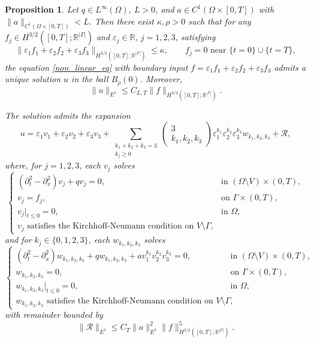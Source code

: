 \documentclass[11pt]{amsart}
\theoremstyle{definition}
\theoremstyle{plain}
\newtheorem{proposition}[definition]{Proposition}
\numberwithin{equation}{section}
\begin{document}
\begin{proposition} \label{prop-diff-epsilon}
Let $q\in L^\infty(\Omega)$, $L>0$, and $a\in C^1(\Omega\times [0,T])$ with $\|a\|_{C^1(\Omega\times [0,T])}<L$. Then there exist $\kappa,\rho>0$ such that for any $f_j\in H^{3/2}([0,T];\mathbb{R}^{|\Gamma|})$ and $\varepsilon_j\in\mathbb{R}$, $j=1,2,3$, satisfying 
\begin{equation*}
    \|\varepsilon_1 f_1+\varepsilon_2 f_2+\varepsilon_3 f_3\|_{H^{3/2}([0,T];\mathbb{R}^{|\Gamma|})}\leq \kappa,
    \qquad 
    f_j = 0 \text{ near } \{t=0\}\cup\{t=T\},
\end{equation*}
the equation \eqref{non_linear_eq} with boundary input $f=\varepsilon_1 f_1+\varepsilon_2 f_2+\varepsilon_3 f_3$ admits a unique solution $u$ in the ball $B_\rho(0)$. Moreover,
\begin{equation*}
    \|u\|_{E^1}\leq C_{L,T}\|f\|_{H^{3/2}([0,T];\mathbb{R}^{|\Gamma|})}.
\end{equation*}

The solution admits the expansion
\begin{equation*}
    u=\varepsilon_1 v_1+\varepsilon_2 v_2+\varepsilon_3 v_3
    +\sum_{\substack{k_1+k_2+k_3=3 \\ k_j \geq 0}}
    \begin{pmatrix}
        3\\k_1,k_2,k_3
    \end{pmatrix}
    \varepsilon_1^{k_1}\varepsilon_2^{k_2}\varepsilon_3^{k_3}
    w_{k_1,k_2,k_3}
    +\mathcal{R},
\end{equation*}
where, for $j=1,2,3$, each $v_j$ solves
\begin{equation*}
\begin{cases}
(\partial_t^2-\partial_x^2)v_j+qv_j=0, & \text{in }(\Omega\setminus V)\times (0,T),\\
v_j=f_j, & \text{on } \Gamma\times(0,T),\\
v_j|_{t\leq 0}=0, & \text{in } \Omega,\\
v_j \text{ satisfies the Kirchhoff-Neumann condition on } V\setminus\Gamma,
\end{cases}
\end{equation*}
and for $k_j\in\{0,1,2,3\}$, each $w_{k_1,k_2,k_3}$ solves
\begin{equation*}
\begin{cases}
(\partial_t^2-\partial_x^2)w_{k_1,k_2,k_3}+q w_{k_1,k_2,k_3}
+av_1^{k_1}v_2^{k_2}v_3^{k_3}=0, & \text{in }(\Omega\setminus V)\times (0,T),\\
w_{k_1,k_2,k_3}=0, & \text{on } \Gamma\times(0,T),\\
w_{k_1,k_2,k_3}|_{t\leq 0}=0, & \text{in } \Omega,\\
w_{k_1,k_2,k_3} \text{ satisfies the Kirchhoff-Neumann condition on } V\setminus\Gamma,
\end{cases}
\end{equation*}
with remainder bounded by
\begin{equation*}
    \|\mathcal{R}\|_{E^1}\leq C_T \|a\|_{E^1}^2  \|f\|_{H^{3/2}([0,T];\mathbb{R}^{|\Gamma|})}^5.
\end{equation*}
\end{proposition}
\end{document}
